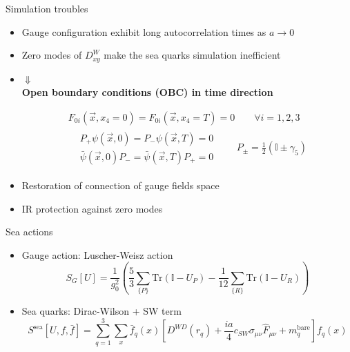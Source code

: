\documentclass{beamer}
\begin{document}
\begin{frame}{Simulation troubles}
      \begin{itemize}
            \item Gauge configuration exhibit long autocorrelation times as $a\rightarrow 0$
            \item Zero modes of $D^W_{xy}$ make the sea quarks simulation inefficient 
            \item[]\begin{center}
                  $\Downarrow$\\
                  {\bf Open boundary conditions (OBC) in time direction}
                  \end{center}
            \begin{equation*}
                  \begin{gathered}
                      F_{0i}(\vec x, x_4=0) = F_{0i}(\vec x, x_4=T) = 0 \qquad \forall i = 1,2,3 \\
                      \begin{aligned}
                          & P_+ \psi (\vec x, 0) = P_- \psi (\vec x, T) = 0 \\
                          & \bar\psi (\vec x, 0) P_- = \bar\psi (\vec x, T) P_+ = 0 
                      \end{aligned}
                      \quad\quad P_{\pm} = \frac{1}{2}\left(\mathbb{I} \pm \gamma_5 \right)
                  \end{gathered}
            \end{equation*}
            \item Restoration of connection of gauge fields space
            \item IR protection against zero modes
      \end{itemize}
\end{frame}

\begin{frame}{Sea actions}
      \begin{itemize}%
            \item Gauge action: Luscher-Weisz action
            $$ S_G[U] = \frac{1}{g_0^2}\left(\frac{5}{3}\sum_{\{P\}} \text{Tr}\left(\mathbb{I} - U_P \right) - \frac{1}{12}\sum_{\{R\}}\text{Tr}\left( \mathbb{I}-U_R \right) \right)$$
            \item Sea quarks: Dirac-Wilson + SW term
            $$ S^\text{sea}[U,f,\bar f] = \sum_{q=1}^3 \sum_{x} \bar f_q (x) \left[ D^{WD}(r_q) + \frac{ia}{4}c_{SW}\sigma_{\mu\nu}\hat{F}_{\mu\nu} + m^\text{bare}_q \right] f_q (x) $$
      \end{itemize}
\end{frame}
\end{document}
